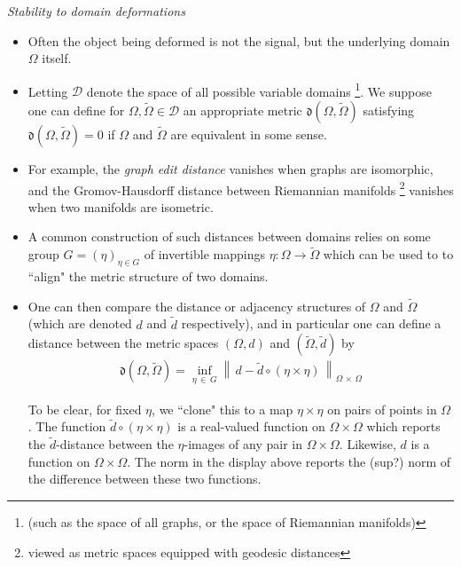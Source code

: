 \documentclass[12pt]{article}
\numberwithin{equation}{section}
\theoremstyle{definition}
\newcommand{		\n		}	{	\noindent					} %
\newcommand{		\1		}	{	\bm{1}					}%
\begin{document}
\n\hrulefill 
\emph{ Stability to domain deformations }
\hrulefill

\begin{itemize}
\item Often the object being deformed is not the signal, but the underlying domain $\Omega$ itself. 

\item Letting $\mathcal{D}$ denote the space of all possible variable domains \footnote{(such as the space of all graphs, or the space of Riemannian manifolds)}. We suppose one can define for $\Omega, \tilde{\Omega} \in \mathcal{D}$ an appropriate metric $\mathfrak{d}( \Omega, \tilde{\Omega})$ satisfying $\mathfrak{d}(\Omega, \tilde{\Omega}) = 0$ if $\Omega$ and $\tilde{\Omega}$ are equivalent in some sense.

\item For example, the \emph{graph edit distance} vanishes when graphs are isomorphic, and the Gromov-Hausdorff distance between Riemannian manifolds \footnote{viewed as metric spaces equipped with geodesic distances} vanishes when two manifolds are isometric. 

\item A common construction of such distances between domains relies on some group $G = ( \eta )_{\eta \in G}$ of invertible mappings $\eta : \Omega \to \tilde{\Omega}$ which can be used to to ``align" the metric structure of two domains. 

\item One can then compare the distance or adjacency structures of $\Omega$ and $\tilde{\Omega}$ (which are denoted $d$ and $\tilde{d}$ respectively), and in particular one can define a distance between the metric spaces $(\Omega,d)$ and $(\tilde{\Omega}, \tilde{d})$ by 
\begin{align}
\label{eq:frak_d_def}
    \mathfrak{d}( \Omega, \tilde{\Omega} ) = \inf_{ \eta \, \in\, G } \left\|\, d - \tilde{d} \circ ( \eta \times \eta ) \, \right\|_{\Omega \, \times \, \Omega}  
\end{align}
    
    To be clear, for fixed $\eta$, we ``clone" this to a map $\eta \times \eta$ on pairs of points in $\Omega$. The function $\tilde{d} \circ (\eta \times \eta)$ is a real-valued function on $\Omega \times \Omega$ which reports the $\tilde{d}$-distance between the $\eta$-images of any pair in $\Omega \times \Omega$. Likewise, $d$ is a function on $\Omega \times \Omega$. The norm in the display above reports the (sup?) norm of the difference between these two functions. 
    

\end{itemize}
\end{document}
